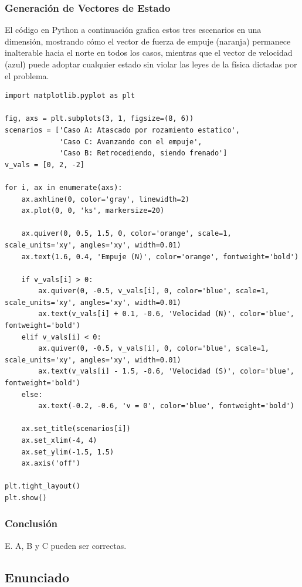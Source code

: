 \documentclass[12pt, a4paper]{article}
\begin{document}
\subsubsection*{Generación de Vectores de Estado}

El código en Python a continuación grafica estos tres escenarios en una dimensión, mostrando cómo el vector de fuerza de empuje (naranja) permanece inalterable hacia el norte en todos los casos, mientras que el vector de velocidad (azul) puede adoptar cualquier estado sin violar las leyes de la física dictadas por el problema.

\begin{lstlisting}
import matplotlib.pyplot as plt

fig, axs = plt.subplots(3, 1, figsize=(8, 6))
scenarios = ['Caso A: Atascado por rozamiento estatico', 
             'Caso C: Avanzando con el empuje', 
             'Caso B: Retrocediendo, siendo frenado']
v_vals = [0, 2, -2]

for i, ax in enumerate(axs):
    ax.axhline(0, color='gray', linewidth=2)
    ax.plot(0, 0, 'ks', markersize=20)
    
    ax.quiver(0, 0.5, 1.5, 0, color='orange', scale=1, scale_units='xy', angles='xy', width=0.01)
    ax.text(1.6, 0.4, 'Empuje (N)', color='orange', fontweight='bold')
    
    if v_vals[i] > 0:
        ax.quiver(0, -0.5, v_vals[i], 0, color='blue', scale=1, scale_units='xy', angles='xy', width=0.01)
        ax.text(v_vals[i] + 0.1, -0.6, 'Velocidad (N)', color='blue', fontweight='bold')
    elif v_vals[i] < 0:
        ax.quiver(0, -0.5, v_vals[i], 0, color='blue', scale=1, scale_units='xy', angles='xy', width=0.01)
        ax.text(v_vals[i] - 1.5, -0.6, 'Velocidad (S)', color='blue', fontweight='bold')
    else:
        ax.text(-0.2, -0.6, 'v = 0', color='blue', fontweight='bold')
        
    ax.set_title(scenarios[i])
    ax.set_xlim(-4, 4)
    ax.set_ylim(-1.5, 1.5)
    ax.axis('off')

plt.tight_layout()
plt.show()
\end{lstlisting}

\subsubsection*{Conclusión}

E. A, B y C pueden ser correctas.


\newpage

\subsection*{Enunciado}
\end{document}
